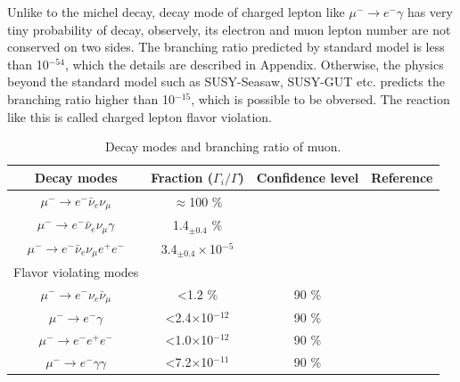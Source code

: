 Unlike to the michel decay, decay mode of charged lepton like $\mu^- \rightarrow e^- \gamma$ has very tiny probability of decay, observely, its electron and muon lepton number are not conserved on two sides.
The branching ratio predicted by standard model is less than 10$^{-54}$, which the details are described in Appendix.
Otherwise, the physics beyond the standard model such as SUSY-Seasaw, SUSY-GUT etc. predicts the branching ratio higher than 10$^{-15}$, which is possible to be obversed.
The reaction like this is called charged lepton flavor violation.
\begin{table}[H]
 \centering
 \begin{tabular}{cccc} \hline \hline
  Decay modes & Fraction ($\Gamma_i/\Gamma$) & Confidence level & Reference \\ \hline
  $\mu^- \rightarrow e^- \bar\nu_e \nu_\mu$ & $\approx$100 \% & & \\
  $\mu^- \rightarrow e^- \bar\nu_e \nu_\mu \gamma$ & 1.4$_{\pm 0.4}$ \% &  & \cite{critt} \\
  $\mu^- \rightarrow e^- \bar\nu_e \nu_\mu e^+ e^-$ & 3.4$_{\pm 0.4}\times$10$^{-5}$ & &  \\ \hline
  Flavor violating modes & & & \\ \hline
  $\mu^- \rightarrow e^- \nu_e \bar\nu_\mu$ & \textless 1.2 \% & 90 \% & \cite{free} \\
  $\mu^- \rightarrow e^- \gamma$ & \textless 2.4$\times$10$^{-12}$ & 90 \% & \cite{bolton} \\
  $\mu^- \rightarrow e^- e^+ e^-$ & \textless 1.0$\times$10$^{-12}$ & 90 \% & \cite{bertl} \\
  $\mu^- \rightarrow e^- \gamma \gamma$ & \textless 7.2$\times$10$^{-11}$ & 90 \% & \\ \hline \hline
 \end{tabular}
 \caption{Decay modes and branching ratio of muon.}
 \label{mudecay}
\end{table}


